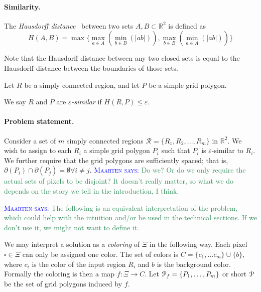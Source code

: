 \documentclass[a4paper, UKenglish]{lipics-v2018}
\newcommand{\mremark}[3]{\textcolor{blue}{\textsc{#1 #2:}} \textcolor{SeaGreen}{\textsf{#3}}}
\newcommand{\maarten}[2][says]{\mremark{Maarten}{#1}{#2}}
\newcommand{\pix}{\square}
\newcommand{\eps}{\varepsilon}
\newcommand{\R}{\mathbb{R}}
\begin{document}
\paragraph {Similarity.}

The {\em Hausdorff distance}~\cite{} between two sets $A, B \subset \R^2$ is defined as 
\[
  H(A, B) = \max \{\max_{a \in A}(\min_{b \in B}(|ab|)), \max_{b \in B}(\min_{a \in A}(|ab|))\}
\]

Note that the Hausdorff distance between any two closed sets is equal to the Hausdorff distance between the boundaries of those sets.

Let $R$ be a simply connected region, and let $P$ be a simple grid polygon.

\begin{definition}
We say $R$ and $P$ are {\em $\eps$-similar} if $H(R,P) \le \eps$. 
\end{definition}


\paragraph {Problem statement.}

Consider a set of $m$ simply connected regions $\mathcal{R} = \{R_1, R_2, \ldots, R_m\}$ in $\mathbb{R}^2$.
We wish to assign to each $R_i$ a simple grid polygon $P_i$ such that $P_i$ is $\eps$-similar to $R_i$.
We further require that the grid polygons are sufficiently spaced; that is, $\partial(P_i) \cap \partial(P_j) = \emptyset \forall i \ne j$. \maarten {Do we? Or do we only require the actual sets of pixels to be disjoint? It doesn't really matter, so what we do depends on the story we tell in the introduction, I think.}

\maarten {The following is an equivalent interpretation of the problem, which could help with the intuition and/or be used in the technical sections. If we don't use it, we might not want to define it.}

We may interpret a solution as a {\em coloring} of $\Xi$ in the following way.
Each pixel $\pix\in\Xi$ can only be assigned one color. The set of colors is $C = \{c_1,\dots c_m\}\cup\{b\}$, where $c_i$ is the color of the input region $R_i$ and $b$ is the background color.
Formally the coloring is then a map $f:\Xi\to C$.
Let ${\cal P}_f=\{P_1,\dots, P_m\}$ or short ${\cal P}$ be the set of grid polygons induced by $f$.
\end{document}
